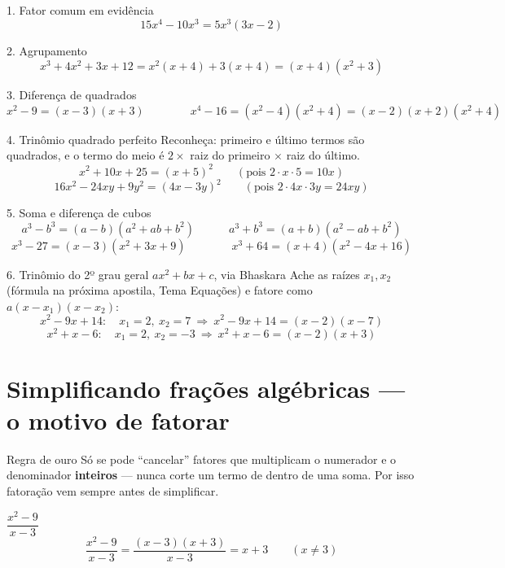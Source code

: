 \documentclass[12pt,a4paper]{article}
\begin{document}
\begin{exemplo}{1. Fator comum em evidência}
\[
15x^4-10x^3 = 5x^3(3x-2)
\]
\end{exemplo}

\begin{exemplo}{2. Agrupamento}
\[
x^3+4x^2+3x+12 = x^2(x+4)+3(x+4) = (x+4)(x^2+3)
\]
\end{exemplo}

\begin{exemplo}{3. Diferença de quadrados}
\[
x^2-9 = (x-3)(x+3) \qquad\qquad x^4-16 = (x^2-4)(x^2+4) = (x-2)(x+2)(x^2+4)
\]
\end{exemplo}

\begin{exemplo}{4. Trinômio quadrado perfeito}
Reconheça: primeiro e último termos são quadrados, e o termo do meio é
$2\times$ raiz do primeiro $\times$ raiz do último.
\[
x^2+10x+25 = (x+5)^2 \qquad (\text{pois } 2\cdot x\cdot5=10x)
\]
\[
16x^2-24xy+9y^2 = (4x-3y)^2 \qquad (\text{pois } 2\cdot4x\cdot3y=24xy)
\]
\end{exemplo}

\begin{exemplo}{5. Soma e diferença de cubos}
\[
a^3-b^3 = (a-b)(a^2+ab+b^2) \qquad\quad a^3+b^3=(a+b)(a^2-ab+b^2)
\]
\[
x^3-27 = (x-3)(x^2+3x+9) \qquad\qquad x^3+64 = (x+4)(x^2-4x+16)
\]
\end{exemplo}

\begin{exemplo}{6. Trinômio do 2º grau geral $ax^2+bx+c$, via Bhaskara}
Ache as raízes $x_1,x_2$ (fórmula na próxima apostila, Tema Equações) e
fatore como $a(x-x_1)(x-x_2)$:
\[
x^2-9x+14: \quad x_1=2,\ x_2=7 \ \Rightarrow\ x^2-9x+14=(x-2)(x-7)
\]
\[
x^2+x-6: \quad x_1=2,\ x_2=-3 \ \Rightarrow\ x^2+x-6 = (x-2)(x+3)
\]
\end{exemplo}

\section{Simplificando frações algébricas — o motivo de fatorar}

\begin{dica}{Regra de ouro}
Só se pode ``cancelar'' fatores que multiplicam o numerador e o
denominador \textbf{inteiros} — nunca corte um termo de dentro de uma soma.
Por isso fatoração vem sempre antes de simplificar.
\end{dica}

\begin{exemplo}{$\dfrac{x^2-9}{x-3}$}
\[
\frac{x^2-9}{x-3} = \frac{(x-3)(x+3)}{x-3} = x+3 \qquad (x\neq3)
\]
\end{exemplo}
\end{document}
